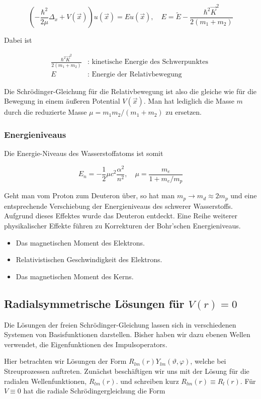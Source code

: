 \documentclass[10pt, letterpaper]{article}
\begin{document}
$$
\left(-\frac{\hbar^{2}}{2 \mu} \Delta_{x}+V(\vec{x})\right) u(\vec{x})=E u(\vec{x}), \quad E=\tilde{E}-\frac{\hbar^{2} \vec{K}^{2}}{2\left(m_{1}+m_{2}\right)}
$$

Dabei ist

$$
\begin{aligned}
\frac{\hbar^{2} \vec{K}^{2}}{2\left(m_{1}+m_{2}\right)} & : \text { kinetische Energie des Schwerpunktes } \\
E & : \text { Energie der Relativbewegung }
\end{aligned}
$$

Die Schrödinger-Gleichung für die Relativbewegung ist also die gleiche wie für die Bewegung in einem äußeren Potential $V(\vec{x})$. Man hat lediglich die Masse $m$ durch die reduzierte Masse $\mu=m_{1} m_{2} /\left(m_{1}+m_{2}\right)$ zu ersetzen.

\subsubsection*{Energieniveaus}
Die Energie-Niveaus des Wasserstoffatoms ist somit

$$
E_{n}=-\frac{1}{2} \mu c^{2} \frac{\alpha^{2}}{n^{2}}, \quad \mu=\frac{m_{e}}{1+m_{e} / m_{p}}
$$

Geht man vom Proton zum Deuteron über, so hat man $m_{p} \rightarrow m_{d} \approx 2 m_{p}$ und eine entsprechende Verschiebung der Energieniveaus des schwerer Wasserstoffs. Aufgrund dieses Effektes wurde das Deuteron entdeckt. Eine Reihe weiterer physikalischer Effekte führen zu Korrekturen der Bohr'schen Energieniveaus.

\begin{itemize}
  \item Das magnetischen Moment des Elektrons.
  \item Relativistischen Geschwindigkeit des Elektrons.
  \item Das magnetischen Moment des Kerns.
\end{itemize}

\subsection*{Radialsymmetrische Lösungen für $V(r)=0$}
Die Lösungen der freien Schrödinger-Gleichung lassen sich in verschiedenen Systemen von Basisfunktionen darstellen. Bisher haben wir dazu ebenen Wellen verwendet, die Eigenfunktionen des Impulsoperators.

Hier betrachten wir Lösungen der Form $R_{l m}(r) Y_{l m}(\vartheta, \varphi)$, welche bei Streuprozessen auftreten. Zunächst beschäftigen wir uns mit der Lösung für die radialen Wellenfunktionen, $R_{l m}(r)$. und schreiben kurz $R_{l m}(r) \equiv R_{l}(r)$. Für $V \equiv 0$ hat die radiale Schrödingergleichung die Form
\end{document}
